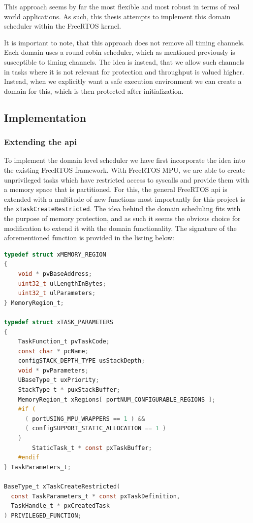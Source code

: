 This approach seems by far the most flexible and most robust in terms of real
world applications. As such, this thesis attempts to implement this domain
scheduler within the FreeRTOS kernel.

It is important to note, that this approach does not remove all timing
channels. Each domain uses a round robin scheduler, which as mentioned
previously is susceptible to timing channels. The idea is instead, that we
allow such channels in tasks where it is not relevant for protection and
throughput is valued higher. Instead, when we explicitly want a safe execution
environment we can create a domain for this, which is then protected after
initialization.


\subsection{Implementation}

\subsubsection{Extending the api}\label{sec:api}

To implement the domain level scheduler we have first incorporate the idea into
the existing FreeRTOS framework. With FreeRTOS MPU, we are able to create
unprivileged tasks which have restricted access to syscalls and provide them
with a memory space that is partitioned. For this, the general FreeRTOS api is
extended with a multitude of new functions most importantly for this project is
the \texttt{xTaskCreateRestricted}.\cite{MemoryProtectionUnit2026} The idea
behind the domain scheduling fits with the purpose of memory protection, and as
such it seems the obvious choice for modification to extend it with the domain
functionality. The signature of the aforementioned function is provided in the
listing below:

\begin{lstlisting}[language={c}, caption={xTaskCreateRestricted function signature}, label={lst:create_restricted}]
typedef struct xMEMORY_REGION
{
    void * pvBaseAddress;
    uint32_t ulLengthInBytes;
    uint32_t ulParameters;
} MemoryRegion_t;

typedef struct xTASK_PARAMETERS
{
    TaskFunction_t pvTaskCode;
    const char * pcName;
    configSTACK_DEPTH_TYPE usStackDepth;
    void * pvParameters;
    UBaseType_t uxPriority;
    StackType_t * puxStackBuffer;
    MemoryRegion_t xRegions[ portNUM_CONFIGURABLE_REGIONS ];
    #if ( 
      ( portUSING_MPU_WRAPPERS == 1 ) && 
      ( configSUPPORT_STATIC_ALLOCATION == 1 ) 
    )
        StaticTask_t * const pxTaskBuffer;
    #endif
} TaskParameters_t;

BaseType_t xTaskCreateRestricted( 
  const TaskParameters_t * const pxTaskDefinition, 
  TaskHandle_t * pxCreatedTask 
) PRIVILEGED_FUNCTION;
\end{lstlisting}

